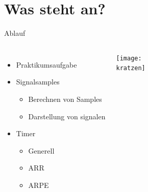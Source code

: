
\section{Was steht an?}
\begin{frame}{Ablauf}
  \begin{columns}
      \begin{itemize}
        \item Praktikumsaufgabe
        \item Signalsamples
        \begin{itemize}
          \item Berechnen von Samples
          \item Darstellung von signalen
        \end{itemize}
        \item Timer
        \begin{itemize}
          \item Generell
          \item ARR
          \item ARPE
        \end{itemize}
      \end{itemize}
    \texttt{[image: \\kratzen]}
  \end{columns}
\end{frame}


